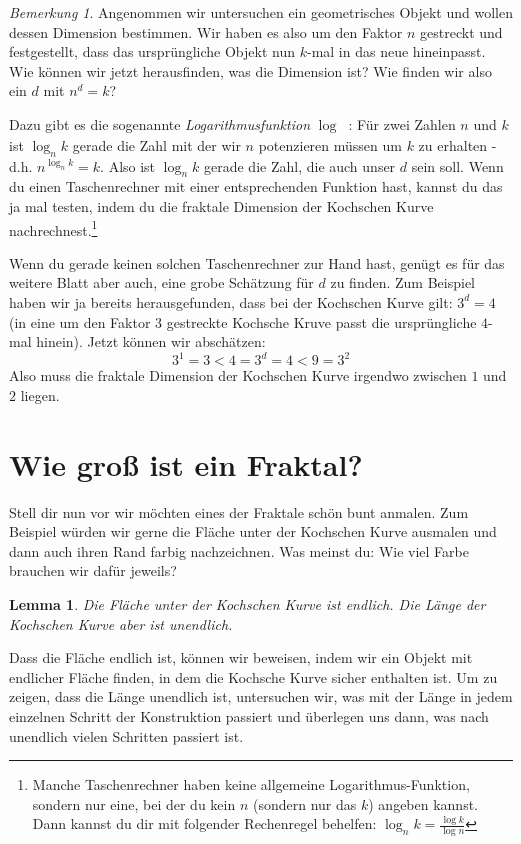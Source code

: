 \documentclass[a4paper,ngerman,12pt]{scrartcl}
\theoremstyle{definition}
\theoremstyle{plain}
\newtheorem{lemma}[defn]{Lemma}
\theoremstyle{remark}
\newtheorem{bem}[defn]{Bemerkung}
\begin{document}
\begin{bem}
	Angenommen wir untersuchen ein geometrisches Objekt und wollen dessen Dimension bestimmen. Wir haben es also um den Faktor $n$ gestreckt und festgestellt, dass das ursprüngliche Objekt nun $k$-mal in das neue hineinpasst. Wie können wir jetzt herausfinden, was die Dimension ist? Wie finden wir also ein $d$ mit $n^d = k$?
	
	Dazu gibt es die sogenannte \emph{Logarithmusfunktion} $\log_{\boxed{}}\boxed{\phantom{k}}$: Für zwei Zahlen $n$ und $k$ ist $\log_n k$ gerade die Zahl mit der wir $n$ potenzieren müssen um $k$ zu erhalten - d.h. $n^{\log_n k} = k$. Also ist $\log_n k$ gerade die Zahl, die auch unser $d$ sein soll. Wenn du einen Taschenrechner mit einer entsprechenden Funktion hast, kannst du das ja mal testen, indem du die fraktale Dimension der Kochschen Kurve nachrechnest.\footnote{Manche Taschenrechner haben keine allgemeine Logarithmus-Funktion, sondern nur eine, bei der du kein $n$ (sondern nur das $k$) angeben kannst. Dann kannst du dir mit folgender Rechenregel behelfen: $\log_n k = \frac{\log k}{\log n}$}
	
	Wenn du gerade keinen solchen Taschenrechner zur Hand hast, genügt es für das weitere Blatt aber auch, eine grobe Schätzung für $d$ zu finden. Zum Beispiel haben wir ja bereits herausgefunden, dass bei der Kochschen Kurve gilt: $3^d=4$ (in eine um den Faktor $3$ gestreckte Kochsche Kruve passt die ursprüngliche $4$-mal hinein). Jetzt können wir abschätzen:
	\[3^1 = 3 < 4 = 3^d = 4 < 9 = 3^2\]
	Also muss die fraktale Dimension der Kochschen Kurve irgendwo zwischen $1$ und $2$ liegen.
\end{bem}

\section{Wie groß ist ein Fraktal?}

Stell dir nun vor wir möchten eines der Fraktale schön bunt anmalen. Zum Beispiel würden wir gerne die Fläche unter der Kochschen Kurve ausmalen und dann auch ihren Rand farbig nachzeichnen. Was meinst du: Wie viel Farbe brauchen wir dafür jeweils?

\begin{lemma}
	Die Fläche unter der Kochschen Kurve ist endlich. Die Länge der Kochschen Kurve aber ist unendlich.
\end{lemma}

Dass die Fläche endlich ist, können wir beweisen, indem wir ein Objekt mit endlicher Fläche finden, in dem die Kochsche Kurve sicher enthalten ist. Um zu zeigen, dass die Länge unendlich ist, untersuchen wir, was mit der Länge in jedem einzelnen Schritt der Konstruktion passiert und überlegen uns dann, was nach unendlich vielen Schritten passiert ist.
\end{document}
